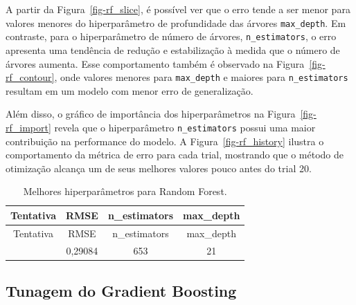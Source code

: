 \documentclass[
  12pt,
  a4paper,
]{scrreprt}
\begin{document}
\vspace{12pt}

A partir da Figura~\ref{fig-rf_slice}, é possível ver que o erro tende a
ser menor para valores menores do hiperparâmetro de profundidade das
árvores \texttt{max\_depth}. Em contraste, para o hiperparâmetro de
número de árvores, \texttt{n\_estimators}, o erro apresenta uma
tendência de redução e estabilização à medida que o número de árvores
aumenta. Esse comportamento também é observado na
Figura~\ref{fig-rf_contour}, onde valores menores para
\texttt{max\_depth} e maiores para \texttt{n\_estimators} resultam em um
modelo com menor erro de generalização.

\vspace{12pt}

Além disso, o gráfico de importância dos hiperparâmetros na
Figura~\ref{fig-rf_import} revela que o hiperparâmetro
\texttt{n\_estimators} possui uma maior contribuição na performance do
modelo. A Figura~\ref{fig-rf_history} ilustra o comportamento da métrica
de erro para cada trial, mostrando que o método de otimização alcança um
de seus melhores valores pouco antes do trial 20.

\begin{longtable}[]{@{}cccc@{}}
\caption{Melhores hiperparâmetros para Random
Forest.}\label{tbl-params_rf}\tabularnewline
\toprule\noalign{}
Tentativa & RMSE & n\_estimators & max\_depth \\
\midrule\noalign{}
\endfirsthead
\toprule\noalign{}
Tentativa & RMSE & n\_estimators & max\_depth \\
\midrule\noalign{}
\endhead
\bottomrule\noalign{}
\endlastfoot
62 & 0,29084 & 653 & 21 \\
\end{longtable}

\subsection{Tunagem do Gradient
Boosting}\label{tunagem-do-gradient-boosting}
\end{document}
